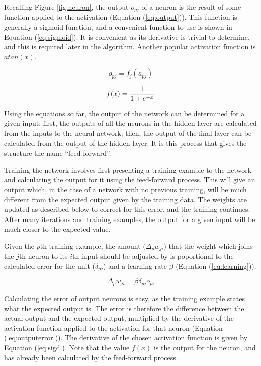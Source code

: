 Recalling Figure \ref{fig:neuron}, the output $o_{pj}$ of a neuron is the result of some function applied to the activation (Equation (\ref{eq:output})).  This function is generally a sigmoid function, and a convenient function to use is shown in Equation (\ref{eq:sigmoid}).  It is convenient as its derivative is trivial to determine, and this is required later in the algorithm.  Another popular activation function is $atan(x)$.

\begin{equation}
o_{pj} = f_j(a_{pj})
\label{eq:output}
\end{equation}

\begin{equation}
f(x) = {1 \over 1 + e^{-x}}
\label{eq:sigmoid}
\end{equation}

Using the equations so far, the output of the network can be determined for a given input: first, the outputs of all the neurons in the hidden layer are calculated from the inputs to the neural network; then, the output of the final layer can be calculated from the output of the hidden layer.  It is this process that gives the structure the name ``feed-forward''.

Training the network involves first presenting a training example to the network and calculating the output for it using the feed-forward process.  This will give an output which, in the case of a network with no previous training, will be much different from the expected output given by the training data.  The weights are updated as described below to correct for this error, and the training continues.  After many iterations and training examples, the output for a given input will be much closer to the expected value.

Given the $p$th training example, the amount ($\Delta_{p}w_{ji}$) that the weight which joins the $j$th neuron to its $i$th input should be adjusted by is poportional to the calculated error for the unit ($\delta_{pj}$) and a learning rate $\beta$ (Equation (\ref{eq:learning})).

\begin{equation}
\Delta_pw_{ji} = \beta\delta_{pj}o_{pi}
\label{eq:learning}
\end{equation}

Calculating the error of output neurons is easy, as the training example states what the expected output is.  The error is therefore the difference between the actual output and the expected output, multiplied by the derivative of the activation function applied to the activation for that neuron (Equation (\ref{eq:outputerror})).  The derivative of the chosen activation function is given by Equation (\ref{eq:sigd}).  Note that the value $f(x)$ is the output for the neuron, and has already been calculated by the feed-forward process.


